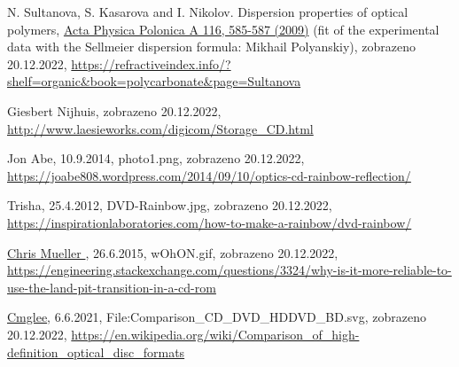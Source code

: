 \documentclass[titlepage]{article}
\begin{document}
\begin{thebibliography}{9}

    N. Sultanova, S. Kasarova and I. Nikolov. Dispersion properties of optical polymers, \href{http://przyrbwn.icm.edu.pl/APP/ABSTR/116/a116-4-42.html}{Acta Physica Polonica A 116, 585-587 (2009)} (fit of the experimental data with the Sellmeier dispersion formula: Mikhail Polyanskiy), zobrazeno 20.12.2022, \href{https://refractiveindex.info/?shelf=organic&book=polycarbonate&page=Sultanova}{https://refractiveindex.info/?shelf=organic\&book=polycarbonate\&page=Sultanova}

    Giesbert Nijhuis, zobrazeno 20.12.2022, \href{http://www.laesieworks.com/digicom/Storage_CD.html}{http://www.laesieworks.com/digicom/Storage\_CD.html}

    Jon Abe, 10.9.2014, photo1.png, zobrazeno 20.12.2022, \href{https://joabe808.wordpress.com/2014/09/10/optics-cd-rainbow-reflection/}{https://joabe808.wordpress.com/2014/09/10/optics-cd-rainbow-reflection/}

    Trisha, 25.4.2012, DVD-Rainbow.jpg, zobrazeno 20.12.2022, \href{https://inspirationlaboratories.com/how-to-make-a-rainbow/dvd-rainbow/}{https://inspirationlaboratories.com/how-to-make-a-rainbow/dvd-rainbow/}

    \href{https://engineering.stackexchange.com/users/272/chris-mueller}{
        Chris Mueller
    }, 26.6.2015, wOhON.gif, zobrazeno 20.12.2022, \href{https://engineering.stackexchange.com/questions/3324/why-is-it-more-reliable-to-use-the-land-pit-transition-in-a-cd-rom}{https://engineering.stackexchange.com/questions/3324/why-is-it-more-reliable-to-use-the-land-pit-transition-in-a-cd-rom}

    \href{https://commons.wikimedia.org/wiki/User:Cmglee}{Cmglee}, 6.6.2021, File:Comparison\_CD\_DVD\_HDDVD\_BD.svg,  zobrazeno 20.12.2022, \href{https://en.wikipedia.org/wiki/Comparison_of_high-definition_optical_disc_formats}{https://en.wikipedia.org/wiki/Comparison\_of\_high-definition\_optical\_disc\_formats}

\end{thebibliography}
\end{document}
